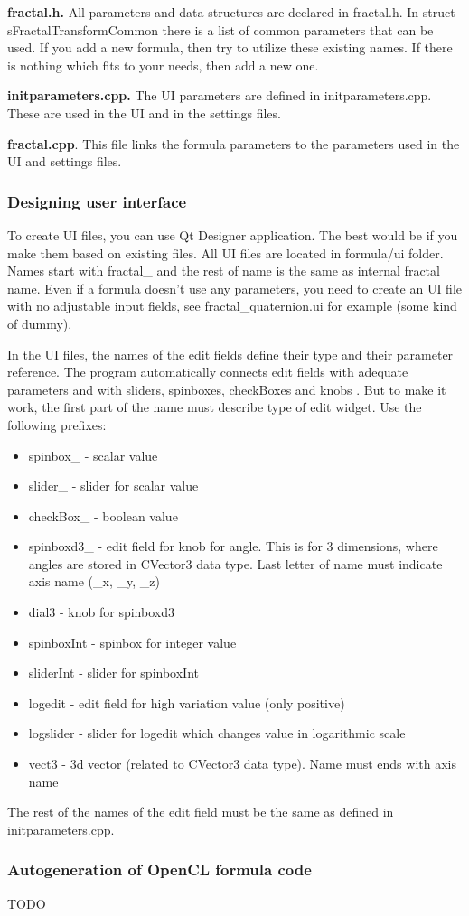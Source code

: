 \textbf{fractal.h.} All parameters and data structures are declared in fractal.h. In struct sFractalTransformCommon there is a list of common parameters that can be used. If you add a new formula, then try to utilize these existing names. If there is nothing which fits to your needs, then add a new one.

\textbf{initparameters.cpp.} The UI parameters are defined in initparameters.cpp.  These are used in the UI and in the settings files. 

\textbf{fractal.cpp}. This file links the formula parameters to the parameters used in the UI and settings files. 



\subsubsection{Designing user interface}\label{developers-designing-user-interface}

To create UI files, you can use Qt Designer application. The best would be if you make them based on existing files. All UI files are located in formula/ui folder. Names start with fractal\_ and the rest of name is the same as internal fractal name. Even if a formula doesn't use any parameters, you need to create an UI file with no adjustable input fields, see fractal\_quaternion.ui for example (some kind of dummy).

In the UI files, the names of the edit fields define their type and their parameter reference. The program automatically connects edit fields with adequate parameters and with sliders, spinboxes, checkBoxes and knobs . But to make it work, the first part of the name must describe type of edit widget. Use the following prefixes:
\begin{itemize}
	\item spinbox\_ - scalar value
	\item slider\_ - slider for scalar value
	\item checkBox\_ - boolean value
	\item spinboxd3\_ - edit field for knob for angle. This is for 3 dimensions, 
		where angles are stored in CVector3 data type. Last letter of name must indicate axis name (\_x, \_y, \_z)
	\item dial3 - knob for spinboxd3
	\item spinboxInt - spinbox for integer value
	\item sliderInt - slider for spinboxInt
	\item logedit - edit field for high variation value (only positive)
	\item logslider - slider for logedit which changes value in logarithmic scale
	\item vect3 - 3d vector (related to CVector3 data type). Name must ends with axis name
\end{itemize}

The rest of the names of the edit field must be the same as defined in initparameters.cpp.

\subsubsection{Autogeneration of OpenCL formula code}\label{developers-autogen-opencl-formulas}

TODO
